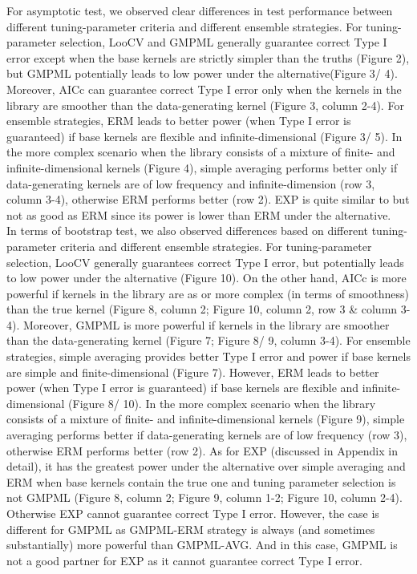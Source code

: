 \documentclass[11pt]{article}
\begin{document}
For asymptotic test, we observed clear differences in test performance between different tuning-parameter criteria and different ensemble strategies. For tuning-parameter selection, LooCV and GMPML generally guarantee correct Type I error except when the base kernels are strictly simpler than the truths (Figure 2), but GMPML potentially leads to low power under the alternative(Figure 3/ 4). Moreover, AICc can guarantee correct Type I error only when the kernels in the library are smoother than the data-generating kernel (Figure 3, column 2-4). For ensemble strategies, ERM leads to better power (when Type I error is guaranteed) if base kernels are flexible and infinite-dimensional (Figure 3/ 5). In the more complex scenario when the library consists of a mixture of finite- and infinite-dimensional kernels (Figure 4), simple averaging performs better only if data-generating kernels are of low frequency and infinite-dimension (row 3, column 3-4), otherwise ERM performs better (row 2). EXP is quite similar to but not as good as ERM since its power is lower than ERM under the alternative.\\

In terms of bootstrap test, we also observed differences based on different tuning-parameter criteria and different ensemble strategies. For tuning-parameter selection, LooCV generally guarantees correct Type I error, but potentially leads to low power under the alternative (Figure 10). On the other hand, AICc is more powerful if kernels in the library are as or more complex (in terms of smoothness) than the true kernel (Figure 8, column 2; Figure 10, column 2, row 3 \& column 3-4). Moreover, GMPML is more powerful if kernels in the library are smoother than the data-generating kernel (Figure 7; Figure 8/ 9, column 3-4). For ensemble strategies, simple averaging provides better Type I error and power if base kernels are simple and finite-dimensional (Figure 7). However, ERM leads to better power (when Type I error is guaranteed) if base kernels are flexible and infinite-dimensional (Figure 8/ 10). In the more complex scenario when the library consists of a mixture of finite- and infinite-dimensional kernels (Figure 9), simple averaging performs better if data-generating kernels are of low frequency (row 3), otherwise ERM performs better (row 2). As for EXP (discussed in Appendix in detail), it has the greatest power under the alternative over simple averaging and ERM when base kernels contain the true one and tuning parameter selection is not GMPML (Figure 8, column 2; Figure 9, column 1-2; Figure 10, column 2-4). Otherwise EXP cannot guarantee correct Type I error. However, the case is different for GMPML as GMPML-ERM strategy is always (and sometimes substantially) more powerful than GMPML-AVG. And in this case, GMPML is not a good partner for EXP as it cannot guarantee correct Type I error.\\
\end{document}
